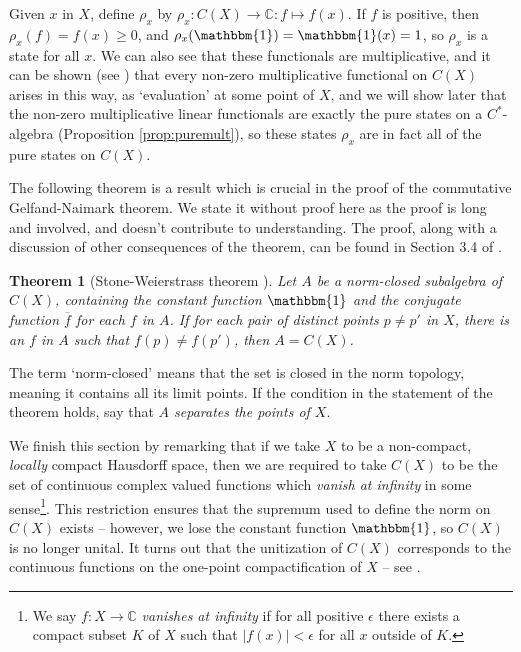 \documentclass[11pt,a4paper]{report}
\theoremstyle{plain}
\newtheorem*{thm*}{Theorem}
\theoremstyle{definition}
\newcommand{\1}{\mathbbm{1}}
\newcommand{\C}{\mathbb{C}}
\newcommand{\CX}{C(X)}
\renewcommand{\bar}{\overline}
\begin{document}
Given $x$ in $X$, define $\rho_x$ by $\rho_x:\CX\to\C:f\mapsto f(x)$. If $f$ is 
positive, then $\rho_x(f) = f(x) \geq 0$, and $\rho_x(\1) = \1(x)=1$, so $\rho_x$ is a 
state for all $x$. We can also see that these functionals are multiplicative, 
and it can be shown (see \cite[Corollary 3.4.2]{kadison83}) that every non-zero 
multiplicative functional on $\CX$ arises in this way, as `evaluation' at some 
point of $X$, and we will show later that the non-zero multiplicative linear 
functionals are exactly the pure states on a $C^\ast$-algebra (Proposition 
\ref{prop:puremult}), so these states $\rho_x$ are in fact all of the 
pure states on $\CX$.


The following theorem is a result which is crucial in the proof of the commutative 
Gelfand-Naimark theorem. We state it without proof here as the proof is long and 
involved, and doesn't contribute to understanding. The proof, along with a 
discussion of other consequences of the theorem, can be found in Section 3.4 of 
\cite{kadison83}.


\begin{thm*}[Stone-Weierstrass theorem {\cite[3.4.15]{kadison83}}]
	Let $A$ be a norm-closed subalgebra of $\CX$, containing the constant function 
	$\1$ and the conjugate function $\bar f$ for each $f$ in $A$. If for each pair 
	of distinct points $p\not=p'$ in $X$, there is an $f$ in $A$ such that 
	$f(p)\not=f(p')$, then $A=\CX$.

\end{thm*}

The term `norm-closed' means that the set is closed in the norm topology, 
meaning it contains all its limit points. If the condition in the statement of 
the theorem holds, say that \emph{$A$ separates the points of $X$}.


We finish this section by remarking that if we take $X$ to be a non-compact, 
\emph{locally} compact Hausdorff space, then we are required to take $\CX$ to be 
the set of continuous complex valued functions which \emph{vanish at infinity} 
in some sense\footnote{We say $f:X\to\C$ \emph{vanishes at infinity} if for all 
positive $\epsilon$ there exists a compact subset $K$ of $X$ such that 
$\left|f(x)\right|<\epsilon$ for all $x$ outside of $K$.}. This restriction 
ensures that the supremum used to define the norm on $\CX$ exists -- however, we 
lose the constant function $\1$, so $\CX$ is no longer unital. 
It turns out that the unitization of $\CX$ corresponds to the continuous 
functions on the one-point compactification of $X$ -- see 
\cite[II.1.2.2]{blackadar06}.
\end{document}
